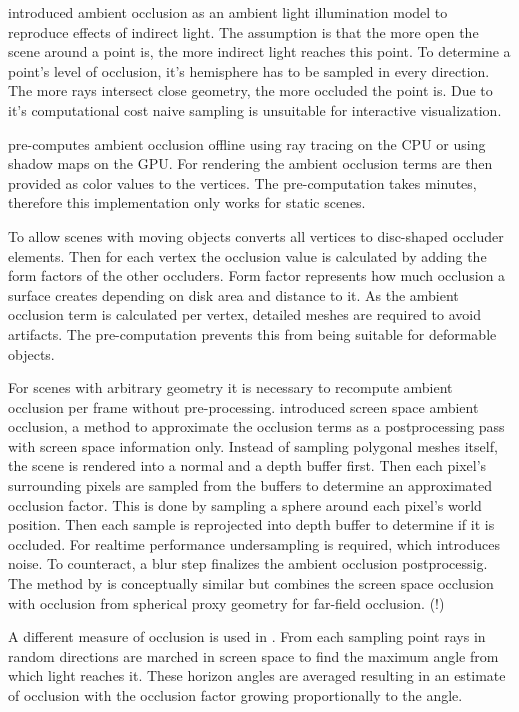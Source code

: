 \documentclass[hyperref,german,diplominf]{cgvpub}
\begin{document}
\cite{19} introduced ambient occlusion as an ambient light illumination model to reproduce effects of indirect light. 
The assumption is that the more open the scene around a point is, the more indirect light reaches this point. To determine a point's level of occlusion, it's hemisphere has to be sampled in every direction. The more rays intersect close geometry, the more occluded the point is. Due to it's computational cost naive sampling is unsuitable for interactive visualization.

\cite{21} pre-computes ambient occlusion offline using ray tracing on the CPU or using shadow maps on the GPU. For rendering the ambient occlusion terms are then provided as color values to the vertices. The pre-computation takes minutes, therefore this implementation only works for static scenes.

To allow scenes with moving objects \cite{22} converts all vertices to disc-shaped occluder elements. Then for each vertex the occlusion value is calculated by adding the form factors of the other occluders. Form factor represents how much occlusion a surface creates depending on disk area and distance to it. As the ambient occlusion term is calculated per vertex, detailed meshes are required to avoid artifacts. The pre-computation prevents this from being suitable for deformable objects.

For scenes with arbitrary geometry it is necessary to recompute ambient occlusion per frame without pre-processing. \cite{29} introduced screen space ambient occlusion, a method to approximate the occlusion terms as a postprocessing pass with screen space information only. Instead of sampling polygonal meshes itself, the scene is rendered into a normal and a depth buffer first. Then each pixel's surrounding pixels are sampled from the buffers to determine an approximated occlusion factor. This is done by sampling a sphere around each pixel's world position. Then each sample is reprojected into depth buffer to determine if it is occluded. For realtime performance undersampling is required, which introduces noise. To counteract, a blur step finalizes the ambient occlusion postprocessig. The method by \cite{33} is conceptually similar but combines the screen space occlusion with occlusion from spherical proxy geometry for far-field occlusion. (!)

A different measure of occlusion is used in \cite{30}. From each sampling point rays in random directions are marched in screen space to find the maximum angle from which light reaches it. These horizon angles are averaged resulting in an estimate of occlusion with the occlusion factor growing proportionally to the angle.
\end{document}
